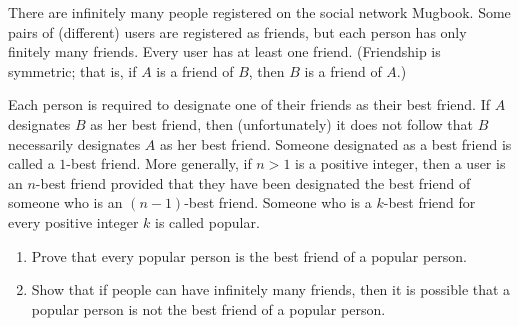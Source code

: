 There are infinitely many people registered on the social network Mugbook. Some pairs of (different) users are registered as friends, but each person has only finitely many friends. Every user has at least one friend. (Friendship is symmetric; that is, if $A$ is a friend of $B$, then $B$ is a friend of $A$.)

Each person is required to designate one of their friends as their best friend. If $A$ designates $B$ as her best friend, then (unfortunately) it does not follow that $B$ necessarily designates $A$ as her best friend. Someone designated as a best friend is called a $1$-best friend. More generally, if $n>1$ is a positive integer, then a user is an $n$-best friend provided that they have been designated the best friend of someone who is an $(n-1)$-best friend. Someone who is a $k$-best friend for every positive integer $k$ is called popular.

\begin{enumerate}[label=(\alph*)]
	\item Prove that every popular person is the best friend of a popular person.
	\item Show that if people can have infinitely many friends, then it is possible that a popular person is not the best friend of a popular person.
\end{enumerate}